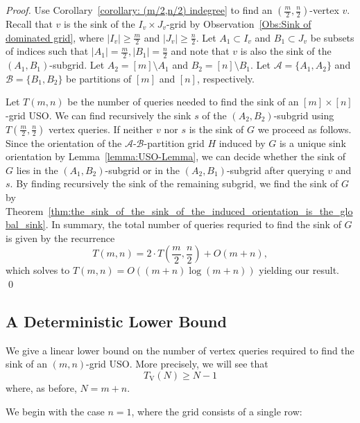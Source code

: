 \documentclass[runningheads,a4paper]{llncs}
\newcommand{\A}{\ensuremath{\mathcal A}}
\newcommand{\B}{\ensuremath{\mathcal B}}
\newcommand{\timeVertex}{\ensuremath{T_\mathrm{V}}}
\begin{document}
\begin{proof}
Use Corollary~\ref{corollary: (m/2,n/2) indegree} to find an $(\frac{m}{2}, \frac{n}{2})$-vertex $v$. 
Recall that $v$ is the sink of the $I_v\times J_v$-grid by Observation~\ref{Obs:Sink of dominated grid}, where $|I_v| \geq \frac{m}{2}$ and $|J_v|\geq \frac{n}{2}$. Let $A_1\subset I_v$ and $B_1\subset J_v$ be subsets of indices such that $|A_1| = \frac{m}{2}, |B_1| = \frac{n}{2}$ and note that $v$ is also the sink of the $(A_1, B_1)$-subgrid.
Let $A_2= [m]\setminus A_1$ and $B_2 = [n]\setminus B_1$.
Let $\A = \{A_1, A_2\}$ and $\B = \{B_1, B_2\}$ be partitions of $[m]$ and $[n]$, respectively.

Let $T(m, n)$ be the number of queries needed to find the sink of an $[m]\times[n]$-grid USO.
We can find recursively the sink $s$ of the $(A_2, B_2)$-subgrid using $T(\frac{m}{2}, \frac{n}{2})$ vertex queries. 
If neither $v$ nor $s$ is the sink of $G$ we proceed as follows.
Since the orientation of the $\A$-$\B$-partition grid $H$ induced by $G$ is a unique sink orientation by Lemma~\ref{lemma:USO-Lemma}, we can decide whether the sink of $G$ lies in the $(A_1, B_2)$-subgrid or in the $(A_2, B_1)$-subgrid after querying $v$ and $s$.
By finding recursively the sink of the remaining subgrid, we find the sink of $G$ by Theorem~\ref{thm:the_sink_of_the_sink_of_the_induced_orientation_is_the_global_sink}. In summary, the total number of queries requried to find the sink of $G$ is given by the recurrence
$$T(m, n) = 2\cdot T\left(\frac{m}{2}, \frac{n}{2}\right) + O(m+n),$$
which solves to $T(m, n) = O((m+n) \log (m+n))$ yielding our result. \qed
\end{proof}
 
\subsection{A Deterministic Lower Bound}
\label{section:a_deterministic_lower_bound}

We give a linear lower bound on the number of vertex queries required to find
the sink of an $(m,n)$-grid USO.
More precisely, we will see that
\[
    \timeVertex(N) \ge N-1
\]
where, as before, $N = m+n$.

We begin with the case $n=1$, where the grid consists of a single row:
\end{document}
